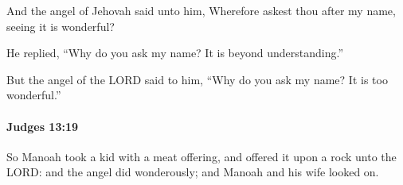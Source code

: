 			\begin{versebox}
					\item[BHS] 
					\item[ASV] And the angel of Jehovah said unto him, Wherefore askest thou after my name, seeing it is wonderful?
					\item[NIV] He replied, “Why do you ask my name? It is beyond understanding.”
					\item[NRSV] But the angel of the LORD said to him, “Why do you ask my name? It is too wonderful.”
			\end{versebox}

		\paragraph{Judges 13:19} %
			\label{JUDGES-13-19}

			So Manoah took a kid with a meat offering, and offered it upon a rock unto the LORD: and the angel did wonderously; and Manoah and his wife looked on.

